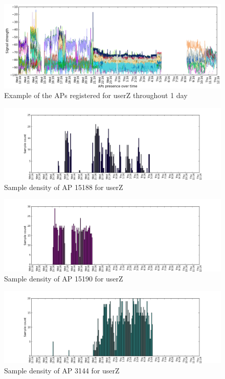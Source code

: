 \begin{figure}[!h]
\centering
\includegraphics[width =\textwidth]{figures/combinations/user_6_sorted_1days_plot_croped.png}
\caption{Example of the APs registered for userZ throughout 1 day}
\label{rssi_6_2nd_day}
\end{figure}

\begin{figure}[!h]
\centering
\includegraphics[width =\textwidth]{figures/combinations/ap_15188_histo.png}
\caption{Sample density of AP 15188 for userZ}
\label{samples_6_2nd_day_1}
\end{figure}

\begin{figure}[!h]
\centering
\includegraphics[width =\textwidth]{figures/combinations/ap_15190_histo.png}
\caption{Sample density of AP 15190 for userZ}
\label{samples_6_2nd_day_2}
\end{figure}

\begin{figure}[!h]
\centering
\includegraphics[width =\textwidth]{figures/combinations/ap_3144_histo.png}
\caption{Sample density of AP 3144 for userZ}
\label{samples_6_2nd_day_3}
\end{figure}

